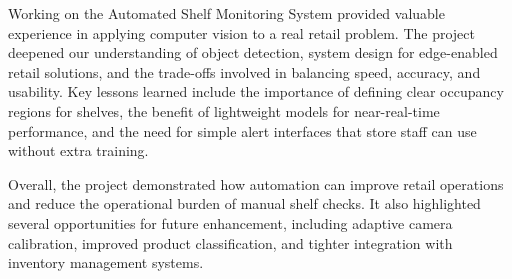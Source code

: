 Working on the Automated Shelf Monitoring System provided valuable experience in applying computer vision to a real retail problem. The project deepened our understanding of object detection, system design for edge-enabled retail solutions, and the trade-offs involved in balancing speed, accuracy, and usability.
Key lessons learned include the importance of defining clear occupancy regions for shelves, the benefit of lightweight models for near-real-time performance, and the need for simple alert interfaces that store staff can use without extra training.

Overall, the project demonstrated how automation can improve retail operations and reduce the operational burden of manual shelf checks. It also highlighted several opportunities for future enhancement, including adaptive camera calibration, improved product classification, and tighter integration with inventory management systems.
